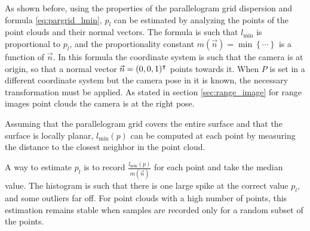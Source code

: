 As shown before, using the properties of the parallelogram grid dispersion and formula \ref{eq:pargrid_lmin}, $p_l$ can be estimated by analyzing the points of the point clouds and their normal vectors. The formula is such that $l_{\text{min}}$ is proportional to $p_l$, and the proportionality constant $m(\vec{n}) = \min \left\{ \cdots \right\}$ is a function of $\vec{n}$. In this formula the coordinate system is such that the camera is at origin, so that a normal vector $\vec{n} = (0, 0, 1)^\intercal$ points towards it. When $P$ is set in a different coordinate system but the camera pose in it is known, the necessary transformation must be applied. As stated in section \ref{sec:range_image} for range images point clouds the camera is at the right pose.

Assuming that the parallelogram grid covers the entire surface and that the surface is locally planar, $l_{\text{min}}(p)$ can be computed at each point by measuring the distance to the closest neighbor in the point cloud.

A way to estimate $p_l$ is to record $\frac{l_{\text{min}}(p)}{m(\vec{n})}$ for each point and take the median value. The histogram is such that there is one large spike at the correct value $p_l$, and some outliers far off. For point clouds with a high number of points, this estimation remains stable when samples are recorded only for a random subset of the points.
